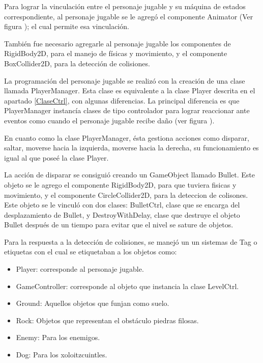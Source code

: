Para lograr la vinculación entre el personaje jugable y su máquina de estados 
correspondiente, al personaje jugable se le agregó el componente Animator 
(Ver figura ); %
el cual permite esa vinculación.   
\\
\par 
También fue necesario agregarle al personaje jugable los componentes de 
RigidBody2D, para el manejo de físicas y movimiento, y el componente 
BoxCollider2D, para la detección de colisiones.
\\
\par 
La programación del personaje jugable se realizó con la creación de una 
clase llamada PlayerManager. Esta clase es equivalente a 
la clase Player descrita en el apartado \ref{ClaseCtrl}, con algunas diferencias.
La principal diferencia es que PlayerManager instancía clases de tipo controlador 
para lograr reaccionar ante eventos como cuando 
el personaje jugable recibe daño (ver figura ). %
\\
\par 
En cuanto como la clase PlayerManager, ésta gestiona acciones como disparar, saltar, 
moverse hacia la izquierda, moverse hacia la derecha, su funcionamiento es igual
al que poseé la clase Player.
\\
\par 
La acción de disparar se consiguió creando un GameObject llamado Bullet. 
Este objeto se le agrego el componente RigidBody2D, para que tuviera fisicas y 
movimiento, y el componente CircleCollider2D, para la deteccion de colisones. 
Este objeto se le vinculó con dos clases: BulletCtrl, clase que se 
encarga del desplazamiento de Bullet, y DestroyWithDelay, clase que destruye el 
objeto Bullet después de un tiempo para evitar que el nivel se sature de objetos.
\\
\par
Para la respuesta a la detección de colisiones, se manejó un un sistemas de Tag 
o etiquetas con el cual se etiquetaban a los objetos como: 
\begin{itemize}
	\item Player: corresponde al personaje jugable.
	\item GameController: corresponde al objeto que instancia la clase LevelCtrl.
	\item Ground: Aquellos objetos que funjan como suelo.
	\item Rock: Objetos que representan el obstáculo piedras filosas.
	\item Enemy: Para los enemigos.
	\item Dog: Para los xoloitzcuintles.
\end{itemize}   
